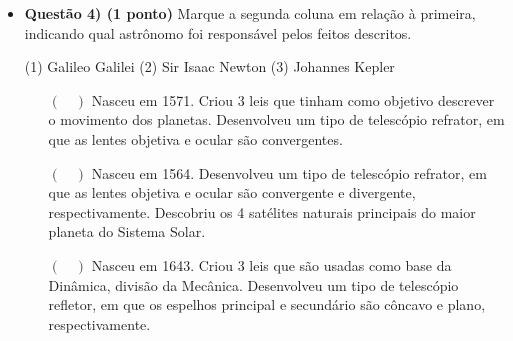 \documentclass[a4paper, 12pt]{article}
\begin{document}
\begin{itemize}
\begin{multicols}{2}
			\end{multicols}
		\newpage
		\item \textbf{Questão 4) (1 ponto)} Marque a segunda coluna em relação à primeira, indicando qual astrônomo foi responsável pelos feitos descritos.
			\begin{multicols}{2}
				\vfill\null \vfill\null
				\begin{flushleft}
					(1) Galileo Galilei \linebreak
					(2) Sir Isaac Newton \linebreak
					(3) Johannes Kepler
				\end{flushleft}
				\vfill\null \vfill\null
				\columnbreak
				\begin{itemize}
					\item[$(\quad)$] Nasceu em 1571. Criou 3 leis que tinham como objetivo descrever o movimento dos planetas. Desenvolveu um tipo de telescópio refrator, em que as lentes objetiva e ocular são convergentes.
					\item[$(\quad)$] Nasceu em 1564. Desenvolveu um tipo de telescópio refrator, em que as lentes objetiva e ocular são convergente e divergente, respectivamente. Descobriu os 4 satélites naturais principais do maior planeta do Sistema Solar.
					\item[$(\quad)$] Nasceu em 1643. Criou 3 leis que são usadas como base da Dinâmica, divisão da Mecânica. Desenvolveu um tipo de telescópio refletor, em que os espelhos principal e secundário são côncavo e plano, respectivamente.
				\end{itemize}
			\end{multicols}


\end{itemize}
\end{document}
